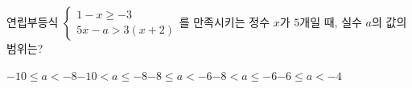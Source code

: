 연립부등식 $\begin{cases} 1-x\ge -3 \\ 5x-a>3(x+2) \end{cases}$를 만족시키는 정수 $x$가 $5$개일 때, 실수 $a$의 값의 범위는?
\begin{choicesii}{$-10\le a<-8$}{$-10<a\le -8$}{$-8\le a<-6$}{$-8<a\le -6$}{$-6\le a<-4$}\end{choicesii}
